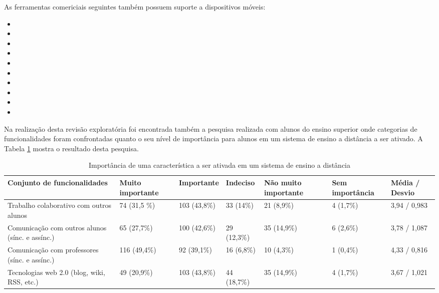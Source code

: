 \noindent
As ferramentas comericiais seguintes também possuem suporte a dispositivos móveis:

\vspace{-5mm}
\begin{itemize}
    \item {}
    \item {}
    \item {}
    \item {}
    \item {}
    \item {}
    \item {}
    \item {}
    \item {}
    \item {}
\end{itemize}

Na realização desta revisão exploratória foi encontrada também a pesquisa \cite{pusnik_investigation_2010} realizada com alunos do ensino superior onde categorias de funcionalidades foram confrontadas quanto o seu nível de importância para alunos em um sistema de ensino a distância a ser ativado. A Tabela \ref{tab:importancia} mostra o resultado desta pesquisa.
 
\bgroup
\def\arraystretch{1.1} %
\begin{table}[h]{} %
\centering
\small
\caption{Importância de uma característica a ser ativada em um sistema de ensino a distância }
\begin{tabular}{ | p{3cm}| p{2cm}| p{2cm}| p{1.8cm}| p{1.8cm}| p{1.5cm} | p{1.7cm}| } \hline
\textbf{Conjunto de funcionalidades} & \textbf{Muito importante} & \textbf{Importante} & \textbf{Indeciso} & \textbf{Não muito importante} & \textbf{Sem importância} & \textbf{Média / Desvio} \\ \hline
Trabalho colaborativo com outros alunos & 74 (31,5 \%) & 103 (43,8\%) & 33 (14\%) & 21 (8,9\%) & 4 (1,7\%) & 3,94 / 0,983 \\ \hline
Comunicação com outros alunos (sínc. e assínc.) & 65 (27,7\%) & 100 (42,6\%) & 29 (12,3\%) & 35 (14,9\%) & 6 (2,6\%) & 3,78 / 1,087 \\ \hline
Comunicação com professores (sínc. e assínc.) & 116 (49,4\%) & 92 (39,1\%) & 16 (6,8\%) & 10 (4,3\%) & 1 (0,4\%) & 4,33 / 0,816 \\ \hline
Tecnologias web 2.0 (blog, wiki, RSS, etc.) & 49 (20,9\%) & 103 (43,8\%) & 44 (18,7\%) & 35 (14,9\%) & 4 (1,7\%) & 3,67 / 1,021 \\ \hline
\end{tabular}
\label{tab:importancia}
\end{table}
\egroup

